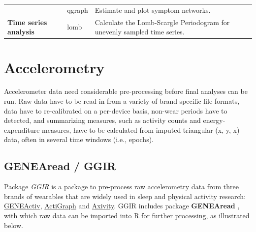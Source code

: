 \documentclass[]{book}
\begin{document}
\begin{longtable}[]{@{}lll@{}}
\begin{minipage}[t]{0.21\columnwidth}\raggedright\strut
\strut
\end{minipage} & \begin{minipage}[t]{0.23\columnwidth}\raggedright\strut
qgraph\strut
\end{minipage} & \begin{minipage}[t]{0.48\columnwidth}\raggedright\strut
Estimate and plot symptom networks.\strut
\end{minipage}\tabularnewline
\begin{minipage}[t]{0.21\columnwidth}\raggedright\strut
\textbf{Time series analysis}\strut
\end{minipage} & \begin{minipage}[t]{0.23\columnwidth}\raggedright\strut
lomb\strut
\end{minipage} & \begin{minipage}[t]{0.48\columnwidth}\raggedright\strut
Calculate the Lomb-Scargle Periodogram for unevenly sampled time
series.\strut
\end{minipage}\tabularnewline
\bottomrule
\end{longtable}

\section{Accelerometry}\label{accelerometry}

Accelerometer data need considerable pre-processing before final
analyses can be run. Raw data have to be read in from a variety of
brand-specific file formats, data have to re-calibrated on a per-device
basis, non-wear periods have to detected, and summarizing measures, such
as activity counts and energy-expenditure measures, have to be
calculated from imputed triangular (x, y, x) data, often in several time
windows (i.e., epochs).

\subsection{GENEAread / GGIR}\label{genearead-ggir}

 

Package \emph{GGIR} \citep{R-GGIR} is a package to pre-process raw
accelerometry data from three brands of wearables that are widely used
in sleep and physical activity research:
\href{https://www.geneactiv.org/}{GENEActiv},
\href{http://actigraphcorp.com/}{ActiGraph} and
\href{http://axivity.com/}{Axivity}. GGIR includes package
\textbf{GENEAread} \citep[GENEAread]{R}, with which raw data can be
imported into R for further processing, as illustrated below.
\end{document}
